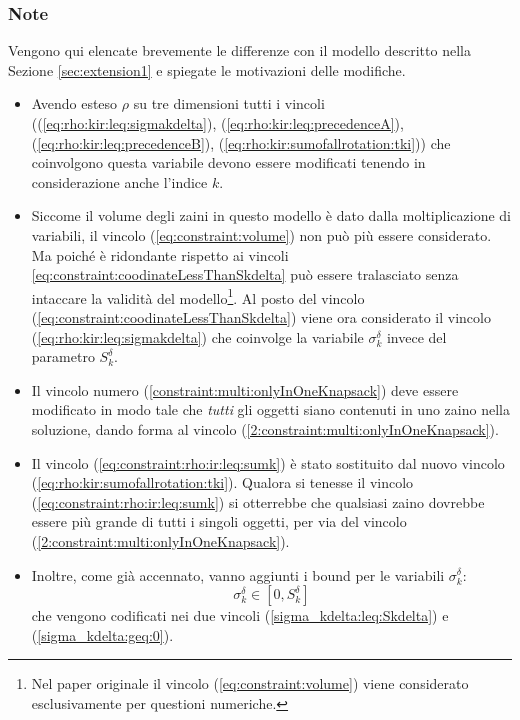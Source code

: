 \documentclass{scrartcl}
\begin{document}
\subsubsection{Note}
\label{sec:extension2:Note}
Vengono qui elencate brevemente le differenze con il modello descritto nella 
Sezione \ref{sec:extension1} e spiegate le motivazioni delle modifiche.
\begin{itemize}
\item Avendo esteso $\rho$ su tre dimensioni tutti i vincoli ((\ref{eq:rho:kir:leq:sigmakdelta}), (\ref{eq:rho:kir:leq:precedenceA}), (\ref{eq:rho:kir:leq:precedenceB}), (\ref{eq:rho:kir:sumofallrotation:tki})) che coinvolgono questa variabile devono essere modificati tenendo in considerazione anche l'indice $k$.

\item Siccome il volume degli zaini in questo modello è dato dalla moltiplicazione di variabili, il vincolo
(\ref{eq:constraint:volume}) non può più essere considerato. 
Ma poiché è ridondante rispetto ai vincoli \ref{eq:constraint:coodinateLessThanSkdelta}
può essere tralasciato senza intaccare la validità del modello\footnote{Nel paper originale il vincolo (\ref{eq:constraint:volume}) viene considerato esclusivamente per questioni numeriche.}. Al posto del vincolo (\ref{eq:constraint:coodinateLessThanSkdelta}) viene ora considerato il vincolo (\ref{eq:rho:kir:leq:sigmakdelta}) che coinvolge la variabile $\sigma_k^\delta$ invece del parametro $S_k^\delta$.

\item Il vincolo numero (\ref{constraint:multi:onlyInOneKnapsack}) deve essere modificato in modo tale che \emph{tutti} gli oggetti siano contenuti in uno zaino nella soluzione, dando forma al vincolo (\ref{2:constraint:multi:onlyInOneKnapsack}).

\item Il vincolo (\ref{eq:constraint:rho:ir:leq:sumk}) è stato sostituito dal nuovo vincolo (\ref{eq:rho:kir:sumofallrotation:tki}). Qualora si tenesse il vincolo (\ref{eq:constraint:rho:ir:leq:sumk}) si otterrebbe che qualsiasi zaino  dovrebbe essere più grande di tutti i singoli oggetti, per via  del vincolo (\ref{2:constraint:multi:onlyInOneKnapsack}).

\item Inoltre, come già accennato, vanno aggiunti i bound per le variabili $\sigma_k^\delta$:
\begin{equation}
\sigma_k^\delta \in [ 0, S_k^\delta ]
\end{equation}
che vengono codificati nei due vincoli
(\ref{sigma_kdelta:leq:Skdelta}) e (\ref{sigma_kdelta:geq:0}).
\end{itemize}
\end{document}
